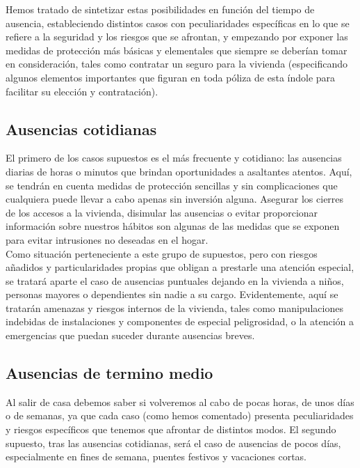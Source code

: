 Hemos tratado de sintetizar estas posibilidades en función del tiempo de ausencia, estableciendo distintos casos con peculiaridades específicas en lo que se refiere a la seguridad y los riesgos que se afrontan, y empezando por exponer las medidas de protección más básicas y elementales que siempre se deberían tomar en consideración, tales como contratar un seguro para la vivienda (especificando algunos elementos importantes que figuran en toda póliza de esta índole para facilitar su elección y contratación).\\

\subsection{Ausencias cotidianas}
El primero de los casos supuestos es el más frecuente y cotidiano: las ausencias diarias de horas o minutos que brindan oportunidades a asaltantes atentos. Aquí, se tendrán en cuenta medidas de protección sencillas y sin complicaciones que cualquiera puede llevar a cabo apenas sin inversión alguna. Asegurar los cierres de los accesos a la vivienda, disimular las ausencias o evitar proporcionar información sobre nuestros hábitos son algunas de las medidas que se exponen para evitar intrusiones no deseadas en el hogar.\\
 
Como situación perteneciente a este grupo de supuestos, pero con riesgos añadidos y particularidades propias que obligan a prestarle una atención especial, se tratará aparte el caso de ausencias puntuales dejando en la vivienda a niños, personas mayores o dependientes sin nadie a su cargo. Evidentemente, aquí se tratarán amenazas y riesgos internos de la vivienda, tales como manipulaciones indebidas de instalaciones y componentes de especial peligrosidad, o la atención a emergencias que puedan suceder durante ausencias breves.\\

\subsection{Ausencias de termino medio}
Al salir de casa debemos saber si volveremos al cabo de pocas horas, de unos días o de semanas, ya que cada caso (como hemos comentado) presenta peculiaridades y riesgos específicos que tenemos que afrontar de distintos modos. El segundo supuesto, tras las ausencias cotidianas, será el caso de ausencias de pocos días, especialmente en fines de semana, puentes festivos y vacaciones cortas.\\
 
